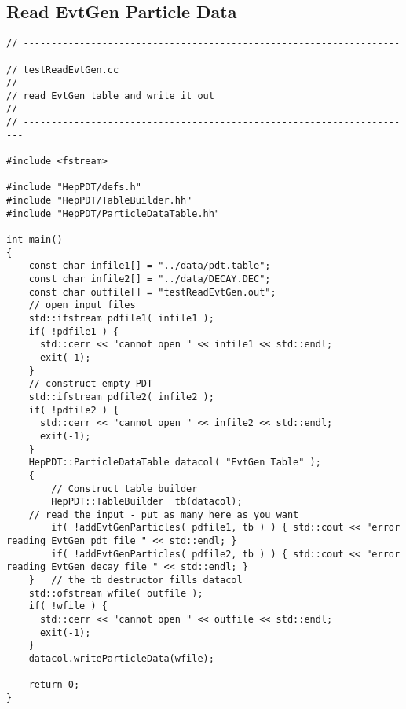 \subsection { Read EvtGen Particle Data }
\begin{verbatim}
// ----------------------------------------------------------------------
// testReadEvtGen.cc
//
// read EvtGen table and write it out
//
// ----------------------------------------------------------------------

#include <fstream>

#include "HepPDT/defs.h"
#include "HepPDT/TableBuilder.hh"
#include "HepPDT/ParticleDataTable.hh"

int main()
{
    const char infile1[] = "../data/pdt.table";
    const char infile2[] = "../data/DECAY.DEC";
    const char outfile[] = "testReadEvtGen.out";
    // open input files
    std::ifstream pdfile1( infile1 );
    if( !pdfile1 ) { 
      std::cerr << "cannot open " << infile1 << std::endl;
      exit(-1);
    }
    // construct empty PDT
    std::ifstream pdfile2( infile2 );
    if( !pdfile2 ) { 
      std::cerr << "cannot open " << infile2 << std::endl;
      exit(-1);
    }
    HepPDT::ParticleDataTable datacol( "EvtGen Table" );
    {
        // Construct table builder
        HepPDT::TableBuilder  tb(datacol);
	// read the input - put as many here as you want
        if( !addEvtGenParticles( pdfile1, tb ) ) { std::cout << "error reading EvtGen pdt file " << std::endl; }
        if( !addEvtGenParticles( pdfile2, tb ) ) { std::cout << "error reading EvtGen decay file " << std::endl; }
    }	// the tb destructor fills datacol
    std::ofstream wfile( outfile );
    if( !wfile ) { 
      std::cerr << "cannot open " << outfile << std::endl;
      exit(-1);
    }
    datacol.writeParticleData(wfile);
    
    return 0;
}
\end{verbatim}

